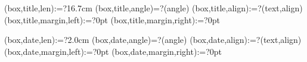 \spine(box,title,len):=?{16.7cm}
\spine(box,title,angle)=?{\thespine(angle)}
\spine(box,title,align):=?{\thespine(text,align)}
\spine(box,title,margin,left):=?{0pt}
\spine(box,title,margin,right):=?{0pt}

\spine(box,date,len):=?{2.0cm}
\spine(box,date,angle)=?{\thespine(angle)}
\spine(box,date,align):=?{\thespine(text,align)}
\spine(box,date,margin,left):=?{0pt}
\spine(box,date,margin,right):=?{0pt}


\newif\ifisdim
\newcommand{\@setifisdim}[1]{%
  \StrLeft{#1}{1}[\@dimleft]%
  \StrRight{#1}{1}[\@dimright]%
  \IfInteger{\@dimleft}{%
    \IfInteger{\@dimright}{%
      \isdimfalse%
    }{%
      \isdimtrue%
    }%
  }{%
    \isdimfalse%
  }%
}
\newcommand{\IfIsDim}[3]{%
  \@setifisdim{#1}%
  \ifisdim#2\else#3\fi%
}

%

\newdimen\@spinelen  %
\newcommand{\@checkspinelen}[1][\paperheight]{%
  \@tempdima=\thespine(margin,left)\relax%
  \@tempdimb=\thespine(margin,right)\relax%
  \DEBUG[\@tempdima]{SPINELEN MARGIN [left]}%
  \DEBUG[\@tempdimb]{SPINELEN MARGIN [right]}%
  \@tempdima=\dimexpr\@tempdima+\@tempdimb\relax%
  \DEBUG[\@tempdima]{SPINELEN ACCUMULATED}%
  \StrCount{\thespine(order)}{,}[\@nBoxSep]%
  \@for\myi:=\expanded{\thespine(order)}\do{%
    \@tempdimb=\thespine(box,\myi,len)\relax%
    \DEBUG[\@tempdimb]{SPINELEN BOXLEN [\myi]}%
    \@tempdima=\dimexpr\@tempdima+\@tempdimb\relax%
    \DEBUG[\@tempdima]{SPINELEN ACCUMULATED}%
  }
  \DEBUG[#1]{SPINELEN MAX}%
  \@spinelen=\@tempdima%
}


\newcommand{\@reverelist}[2]{%
  \def\@rvstmp{}%
  \@for\myi:={#1}\do{%
    \epreto\@rvstmp{,\myi}%
  }%
  \edef\@rvstmp{\expandafter\@gobble\@rvstmp}%
  \edef#2{\@rvstmp}%
}


\providecommand*{\DivideLengths}[2]{%
  \strip@pt\dimexpr\number\numexpr\number\dimexpr#1\relax*65536/\number\dimexpr#2\relax\relax sp\relax
}



